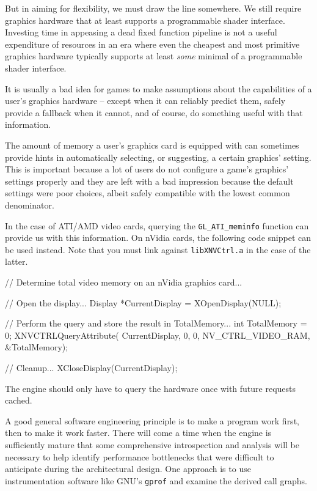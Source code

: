 But in aiming for flexibility, we must draw the line somewhere. We still require graphics hardware that at least supports a programmable shader interface. Investing time in appeasing a dead fixed function pipeline is not a useful expenditure of resources in an era where even the cheapest and most primitive graphics hardware typically supports at least {\it some} minimal of a programmable shader interface.

It is usually a bad idea for games to make assumptions about the capabilities of a user's graphics hardware -- except when it can reliably predict them, safely provide a fallback when it cannot, and of course, do something useful with that information. 

The amount of memory a user's graphics card is equipped with can sometimes provide hints in automatically selecting, or suggesting, a certain graphics' setting. This is important because a lot of users do not configure a game's graphics' settings properly and they are left with a bad impression because the default settings were poor choices, albeit safely compatible with the lowest common denominator.

In the case of ATI/AMD video cards, querying the {\tt GL_ATI_meminfo} function can provide us with this information. On nVidia cards, the following code snippet can be used instead. Note that you must link against {\tt libXNVCtrl.a} in the case of the latter.

\startCodeExample
// Determine total video memory on an nVidia graphics card...

    // Open the display...
    Display *CurrentDisplay = XOpenDisplay(NULL);

    // Perform the query and store the result in TotalMemory...
    int TotalMemory = 0;
    XNVCTRLQueryAttribute(
        CurrentDisplay, 0, 0, NV_CTRL_VIDEO_RAM, &TotalMemory);
    
    // Cleanup...
    XCloseDisplay(CurrentDisplay);
\stopCodeExample

The engine should only have to query the hardware once with future requests cached.

A good general software engineering principle is to make a program work first, then to make it work faster. There will come a time when the engine is sufficiently mature that some comprehensive introspection and analysis will be necessary to help identify performance bottlenecks that were difficult to anticipate during the architectural design. One approach is to use instrumentation software like GNU's {\tt gprof} and examine the derived call graphs.

